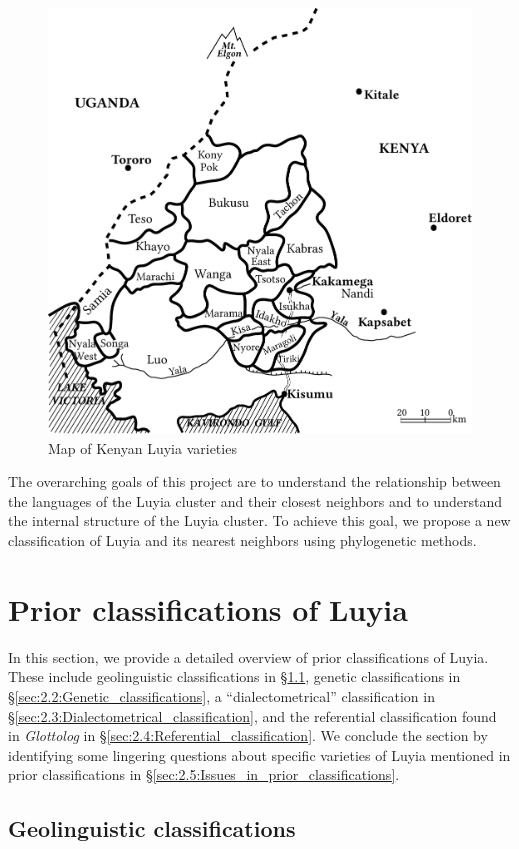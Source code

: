 \documentclass[output=paper]{langscibook}
\begin{document}
\begin{figure}
  \caption{Map of Kenyan Luyia varieties \citep[35]{heine_language_1980}\label{fig:10:KenyanLuyia}}
  \includegraphics[width=.66\textwidth]{figures/Kenyan-Luyia-Varieties.pdf}
\end{figure}

The overarching goals of this project are to understand the relationship between the languages of the Luyia cluster and their closest neighbors and to understand the internal structure of the Luyia cluster. To achieve this goal, we propose a new classification of Luyia and its nearest neighbors using phylogenetic methods.  

\section{Prior classifications of Luyia}\label{sec:2:Prior_classifications}\largerpage

In this section, we provide a detailed overview of prior classifications of Luyia. These include geolinguistic classifications in \S\ref{sec:2.1:Geolinguistic_classifications}, genetic classifications in \S\ref{sec:2.2:Genetic_classifications}, a “dialectometrical” classification in \S\ref{sec:2.3:Dialectometrical_classification}, and the referential classification found in \emph{Glottolog} in \S\ref{sec:2.4:Referential_classification}. We conclude the section by identifying some lingering questions about specific varieties of Luyia mentioned in prior classifications in \S\ref{sec:2.5:Issues_in_prior_classifications}.

\subsection{Geolinguistic classifications \citep{guthrie_classification_1948,guthrie_comparative_1967,maho_nugl_2009,lewis_ethnologue:_2016}}
\label{sec:2.1:Geolinguistic_classifications}
\end{document}
